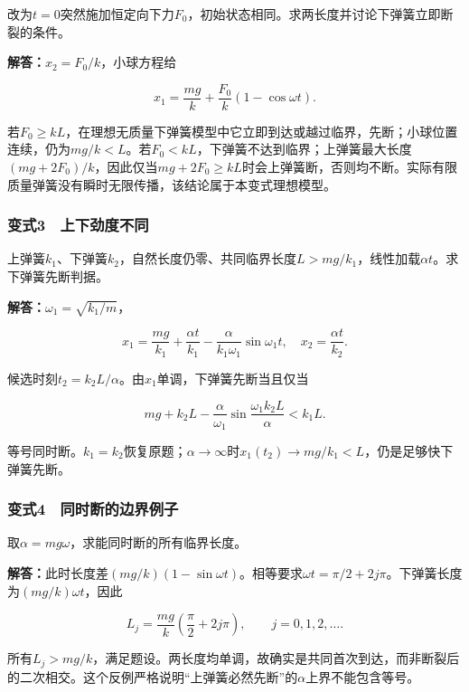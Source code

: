 \documentclass[12pt,a4paper,fontset=fandol]{ctexart}
\begin{document}
改为\(t=0\)突然施加恒定向下力\(F_0\)，初始状态相同。求两长度并讨论下弹簧立即断裂的条件。

\textbf{解答：}\(x_2=F_0/k\)，小球方程给

\[
x_1=\frac{mg}k+\frac{F_0}k(1-\cos\omega t).
\]

若\(F_0\geq kL\)，在理想无质量下弹簧模型中它立即到达或越过临界，先断；小球位置连续，仍为\(mg/k<L\)。若\(F_0<kL\)，下弹簧不达到临界；上弹簧最大长度\((mg+2F_0)/k\)，因此仅当\(mg+2F_0\geq kL\)时会上弹簧断，否则均不断。实际有限质量弹簧没有瞬时无限传播，该结论属于本变式理想模型。

\subsubsection{变式3　上下劲度不同}\label{ux53d8ux5f0f3-ux4e0aux4e0bux52b2ux5ea6ux4e0dux540c}

上弹簧\(k_1\)、下弹簧\(k_2\)，自然长度仍零、共同临界长度\(L>mg/k_1\)，线性加载\(\alpha t\)。求下弹簧先断判据。

\textbf{解答：}\(\omega_1=\sqrt{k_1/m}\)，

\[
x_1=\frac{mg}{k_1}+\frac{\alpha t}{k_1}
-\frac{\alpha}{k_1\omega_1}\sin\omega_1t,\quad
x_2=\frac{\alpha t}{k_2}.
\]

候选时刻\(t_2=k_2L/\alpha\)。由\(x_1\)单调，下弹簧先断当且仅当

\[
mg+k_2L-\frac{\alpha}{\omega_1}
\sin\frac{\omega_1k_2L}{\alpha}<k_1L.
\]

等号同时断。\(k_1=k_2\)恢复原题；\(\alpha\to\infty\)时\(x_1(t_2)\to mg/k_1<L\)，仍是足够快下弹簧先断。

\par\noindent\begin{minipage}{\linewidth}
\subsubsection{变式4　同时断的边界例子}\label{ux53d8ux5f0f4-ux540cux65f6ux65adux7684ux8fb9ux754cux4f8bux5b50}

取\(\alpha=mg\omega\)，求能同时断的所有临界长度。

\textbf{解答：}此时长度差\((mg/k)(1-\sin\omega t)\)。相等要求\(\omega t=\pi/2+2j\pi\)。下弹簧长度为\((mg/k)\omega t\)，因此

\[
L_j=\frac{mg}k\left(\frac\pi2+2j\pi\right),
\qquad j=0,1,2,\ldots.
\]

所有\(L_j>mg/k\)，满足题设。两长度均单调，故确实是共同首次到达，而非断裂后的二次相交。这个反例严格说明``上弹簧必然先断''的\(\alpha\)上界不能包含等号。

\end{minipage}\par
\clearpage
\end{document}
